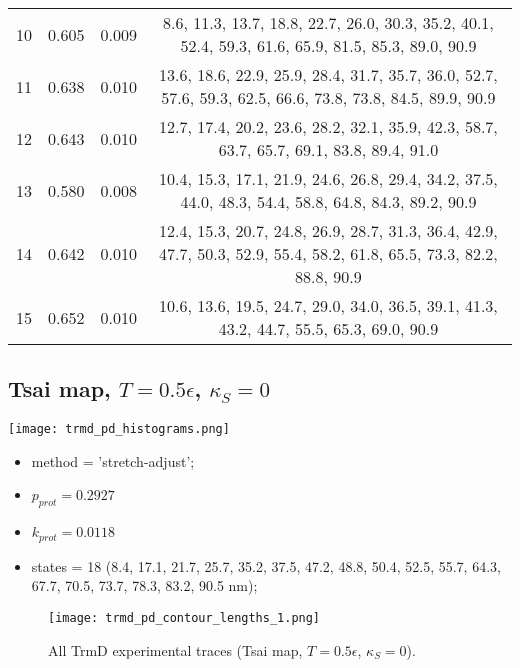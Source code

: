 \begin{table}
\begin{tabular}{c|c|c|c}
        10 & 0.605 & 0.009 & 8.6, 11.3, 13.7, 18.8, 22.7, 26.0, 30.3, 35.2, 40.1, 52.4, 59.3, 61.6, 65.9, 81.5, 85.3, 89.0, 90.9\\
        11 & 0.638 & 0.010 & 13.6, 18.6, 22.9, 25.9, 28.4, 31.7, 35.7, 36.0, 52.7, 57.6, 59.3, 62.5, 66.6, 73.8, 73.8, 84.5, 89.9, 90.9\\
        12 & 0.643 & 0.010 & 12.7, 17.4, 20.2, 23.6, 28.2, 32.1, 35.9, 42.3, 58.7, 63.7, 65.7, 69.1, 83.8, 89.4, 91.0\\
        13 & 0.580 & 0.008 & 10.4, 15.3, 17.1, 21.9, 24.6, 26.8, 29.4, 34.2, 37.5, 44.0, 48.3, 54.4, 58.8, 64.8, 84.3, 89.2, 90.9\\
        14 & 0.642 & 0.010 & 12.4, 15.3, 20.7, 24.8, 26.9, 28.7, 31.3, 36.4, 42.9, 47.7, 50.3, 52.9, 55.4, 58.2, 61.8, 65.5, 73.3, 82.2, 88.8, 90.9\\
        15 & 0.652 & 0.010 & 10.6, 13.6, 19.5, 24.7, 29.0, 34.0, 36.5, 39.1, 41.3, 43.2, 44.7, 55.5, 65.3, 69.0, 90.9\\\hline
    \end{tabular}
\end{table}

\subsection{Tsai map, $T=0.5\epsilon$, $\kappa_S=0$}
\label{subsec:trmd-pd}
\begin{minipage}[c]{0.7\textwidth}
    \texttt{[image: trmd\_pd\_histograms.png]}
\end{minipage}
\hfill
\begin{minipage}[c]{0.45\textwidth}
    \begin{itemize}
        \item method = 'stretch-adjust';
        \item $p_{prot}=0.2927$
        \item $k_{prot}=0.0118$
        \item states = 18 (8.4, 17.1, 21.7, 25.7, 35.2, 37.5, 47.2, 48.8, 50.4, 52.5, 55.7, 64.3, 67.7, 70.5, 73.7, 78.3, 83.2, 90.5 nm);
    \end{itemize}
\end{minipage}

\begin{figure}
    \centering
    \texttt{[image: trmd\_pd\_contour\_lengths\_1.png]}
    \caption{All TrmD experimental traces (Tsai map, $T=0.5\epsilon$, $\kappa_S=0$).}
    \label{fig:trmd-pd-cl1}
\end{figure}


